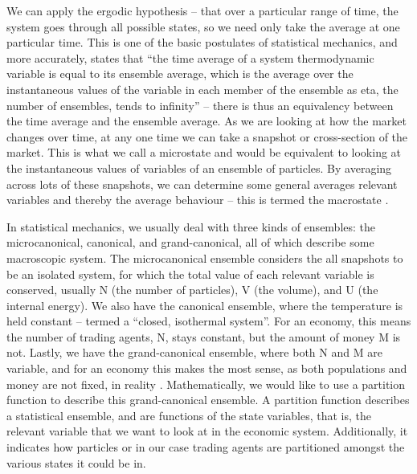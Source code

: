 \documentclass[a4paper, 12pt]{article}
\begin{document}
We can apply the ergodic hypothesis – that over a particular range of time, the system goes through all possible states, so we need only take the average at one particular time. This is one of the basic postulates of statistical mechanics, and more accurately, states that “the time average of a system thermodynamic variable is equal to its ensemble average, which is the average over the instantaneous values of the variable in each member of the ensemble as eta, the number of ensembles, tends to infinity” – there is thus an equivalency between the time average and the ensemble average\cite{laurendeau}.  As we are looking at how the market changes over time, at any one time we can take a snapshot or cross-section of the market. This is what we call a microstate and would be equivalent to looking at the instantaneous values of variables of an ensemble of particles. By averaging across lots of these snapshots, we can determine some general averages relevant variables and thereby the average behaviour – this is termed the macrostate \cite{laurendeau}. 

In statistical mechanics, we usually deal with three kinds of ensembles: the microcanonical, canonical, and grand-canonical, all of which describe some macroscopic system. The microcanonical ensemble considers the all snapshots to be an isolated system, for which the total value of each relevant variable is conserved, usually N (the number of particles), V (the volume), and U (the internal energy). We also have the canonical ensemble, where the temperature is held constant – termed a “closed, isothermal system”. For an economy, this means the number of trading agents, N, stays constant, but the amount of money M is not. Lastly, we have the grand-canonical ensemble, where both N and M are variable, and for an economy this makes the most sense, as both populations and money are not fixed, in reality \cite{KUSMARTSEV}. 
Mathematically, we would like to use a partition function to describe this grand-canonical ensemble. A partition function describes a statistical ensemble, and are functions of the state variables, that is, the relevant variable that we want to look at in the economic system. Additionally, it indicates how particles or in our case trading agents are partitioned amongst the various states it could be in. 
\end{document}
